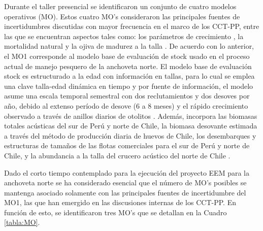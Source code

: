 
Durante el taller presencial se identificaron un conjunto de cuatro modelos operativos (MO). Estos cuatro MO's consideraron las principales fuentes de incertidumbres discutidas con mayor frecuencia en el marco de los CCT-PP, entre las que se encuentran aspectos tales como: los parámetros de crecimiento \citep{cerna2016daily}, la mortalidad natural y la ojiva de madurez a la talla \citep{Hernandez2023}. De acuerdo con lo anterior, el MO1 corresponde al modelo base de evaluación de stock usado en el proceso actual de manejo pesquero de la anchoveta norte. El modelo base de evaluación stock es estructurado a la edad con información en tallas, para lo cual se emplea una clave talla-edad dinámica en tiempo y por fuente de información, el modelo asume una escala temporal semestral con dos reclutamientos y dos desoves por año, debido al extenso período de desove (6 a 8 meses) y el rápido crecimiento observado a través de anillos diarios de otolitos \citep{cerna2016daily}. Además, incorpora las biomasas totales acústicas del sur de Perú y norte de Chile, la biomasa desovante estimada a través del método de producción diaria de huevos de Chile, los desembarques y estructuras de tamaños de las flotas comerciales para el sur de Perú y norte de Chile, y la abundancia a la talla del crucero acústico del norte de Chile \citep{espinola2023}.
\newline

Dado el corto tiempo contemplado para la ejecución del proyecto EEM para la anchoveta norte se ha considerado esencial que el número de MO’s posibles se mantenga asociado solamente con las principales fuentes de incertidumbre del MO1, las que han emergido en las discusiones internas de los CCT-PP. En función de esto, se identificaron tres MO’s que se detallan en la Cuadro \ref*{tabla:MO}.

